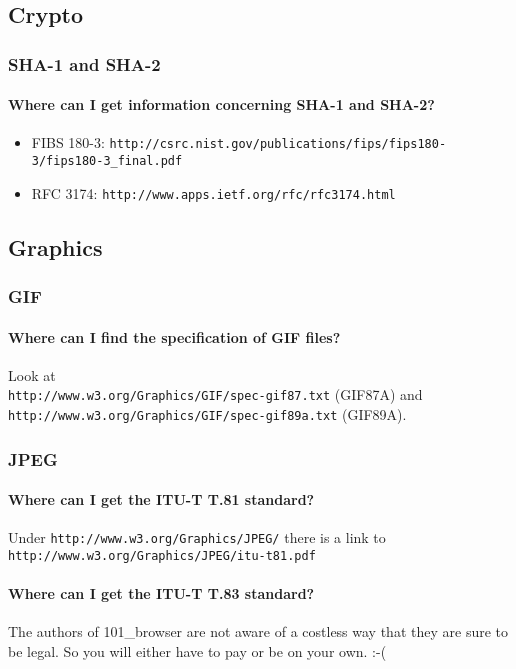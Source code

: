 \documentclass[10pt]{scrbook}
\begin{document}
\subsection{Crypto}

\subsubsection{SHA-1 and SHA-2}

\paragraph{Where can I get information concerning SHA-1 and SHA-2?}
\begin{itemize}
\item FIBS 180-3: \verb|http://csrc.nist.gov/publications/fips/fips180-3/fips180-3_final.pdf|
\item RFC 3174: \verb|http://www.apps.ietf.org/rfc/rfc3174.html|
\end{itemize}

\subsection{Graphics}

\subsubsection{GIF}

\paragraph{Where can I find the specification of GIF files?}
Look at \\
\verb|http://www.w3.org/Graphics/GIF/spec-gif87.txt| (GIF87A) and \\
\verb|http://www.w3.org/Graphics/GIF/spec-gif89a.txt| (GIF89A).

\subsubsection{JPEG}

\paragraph{Where can I get the ITU-T T.81 standard?} Under \verb|http://www.w3.org/Graphics/JPEG/| there is a link to \verb|http://www.w3.org/Graphics/JPEG/itu-t81.pdf|

\paragraph{Where can I get the ITU-T T.83 standard?} The authors of 101\_browser are not aware of a costless way that they are sure to be legal. So you will either have to pay or be on your own. :-(
\end{document}
